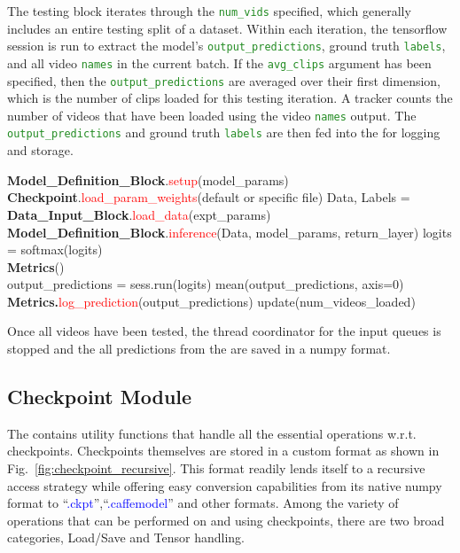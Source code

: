 \documentclass{llncs}
\begin{document}
The testing block iterates through the \texttt{\textcolor{ForestGreen}{num\_vids}} specified, which generally includes an entire testing split of a dataset.
Within each iteration, the tensorflow session is run to extract the model's \texttt{\textcolor{ForestGreen}{output\_predictions}}, ground truth \texttt{\textcolor{ForestGreen}{labels}}, and all video \texttt{\textcolor{ForestGreen}{names}} in the current batch.
If the \texttt{\textcolor{ForestGreen}{avg\_clips}} argument has been specified, then the \texttt{\textcolor{ForestGreen}{output\_predictions}} are averaged over their first dimension, which is the number of clips loaded for this testing iteration.
A tracker counts the number of videos that have been loaded using the video \texttt{\textcolor{ForestGreen}{names}} output.
The \texttt{\textcolor{ForestGreen}{output\_predictions}} and ground truth \texttt{\textcolor{ForestGreen}{labels}} are then fed into the \metrics for logging and storage.

\begin{algorithmic}[H]
\State \textbf{Model\_Definition\_Block}.\textcolor{red}{setup}(model\_params)
\State \textbf{Checkpoint}.\textcolor{red}{load\_param\_weights}(default or specific file)
\State Data, Labels = \textbf{Data\_Input\_Block}.\textcolor{red}{load\_data}(expt\_params)
\\
\State \textbf{Model\_Definition\_Block}.\textcolor{red}{inference}(Data, model\_params, return\_layer)
\State logits = softmax(logits)
\EndIf
\EndFor
\\
\State \textbf{Metrics}()
\\
\State output\_predictions = sess.run(logits)
\State mean(output\_predictions, axis=0)
\EndIf
\State \textbf{Metrics.}\textcolor{red}{log\_prediction}(output\_predictions)
\State update(num\_videos\_loaded)
\EndWhile
\EndProcedure
\end{algorithmic}

Once all videos have been tested, the thread coordinator for the input queues is stopped and the all predictions from the \metrics are saved in a numpy format.

\subsection{Checkpoint Module}
\label{sec:checkpoint}
The \checkpoint contains utility functions that handle all the essential operations w.r.t. checkpoints.
Checkpoints themselves are stored in a custom format as shown in Fig.~\ref{fig:checkpoint_recursive}.
This format readily lends itself to a recursive access strategy while offering easy conversion capabilities from its native numpy format to ``\textcolor{blue}{.ckpt}'',``\textcolor{blue}{.caffemodel}'' and other formats.
Among the variety of operations that can be performed on and using checkpoints, there are two broad categories, Load/Save and Tensor handling.
\end{document}
